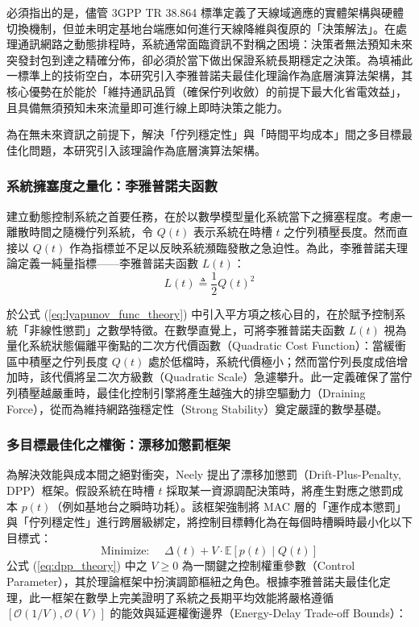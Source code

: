 必須指出的是，儘管 3GPP TR 38.864 標準定義了天線域適應的實體架構與硬體切換機制，但並未明定基地台端應如何進行天線降維與復原的「決策解法」。在處理通訊網路之動態排程時，系統通常面臨資訊不對稱之困境：決策者無法預知未來突發封包到達之精確分佈，卻必須於當下做出保證系統長期穩定之決策。為填補此一標準上的技術空白，本研究引入李雅普諾夫最佳化理論作為底層演算法架構，其核心優勢在於能於「維持通訊品質（確保佇列收斂）的前提下最大化省電效益」，且具備無須預知未來流量即可進行線上即時決策之能力。

為在無未來資訊之前提下，解決「佇列穩定性」與「時間平均成本」間之多目標最佳化問題，本研究引入該理論作為底層演算法架構。

\subsubsection{系統擁塞度之量化：李雅普諾夫函數}
建立動態控制系統之首要任務，在於以數學模型量化系統當下之擁塞程度。考慮一離散時間之隨機佇列系統，令 $Q(t)$ 表示系統在時槽 $t$ 之佇列積壓長度。然而直接以 $Q(t)$ 作為指標並不足以反映系統瀕臨發散之急迫性。為此，李雅普諾夫理論定義一純量指標——李雅普諾夫函數 $L(t)$：
\begin{equation}
    L(t) \triangleq \frac{1}{2} Q(t)^2
    \label{eq:lyapunov_func_theory}
\end{equation}

於公式 (\ref{eq:lyapunov_func_theory}) 中引入平方項之核心目的，在於賦予控制系統「非線性懲罰」之數學特徵。在數學直覺上，可將李雅普諾夫函數 $L(t)$ 視為量化系統狀態偏離平衡點的二次方代價函數（Quadratic Cost Function）：當緩衝區中積壓之佇列長度 $Q(t)$ 處於低檔時，系統代價極小；然而當佇列長度成倍增加時，該代價將呈二次方級數（Quadratic Scale）急遽攀升。此一定義確保了當佇列積壓越嚴重時，最佳化控制引擎將產生越強大的排空驅動力（Draining Force），從而為維持網路強穩定性（Strong Stability）奠定嚴謹的數學基礎。
\subsubsection{多目標最佳化之權衡：漂移加懲罰框架}
為解決效能與成本間之絕對衝突，Neely 提出了漂移加懲罰（Drift-Plus-Penalty, DPP）框架。假設系統在時槽 $t$ 採取某一資源調配決策時，將產生對應之懲罰成本 $p(t)$（例如基地台之瞬時功耗）。該框架強制將 MAC 層的「運作成本懲罰」與「佇列穩定性」進行跨層級綁定，將控制目標轉化為在每個時槽瞬時最小化以下目標式：
\begin{equation}
    \text{Minimize: } \quad \Delta(t) + V \cdot \mathbb{E} [p(t) \mid Q(t)] 
    \label{eq:dpp_theory}
\end{equation}
公式 (\ref{eq:dpp_theory}) 中之 $V \ge 0$ 為一關鍵之控制權重參數（Control Parameter），其於理論框架中扮演調節樞紐之角色。根據李雅普諾夫最佳化定理，此一框架在數學上完美證明了系統之長期平均效能將嚴格遵循 $[ \mathcal{O}(1/V), \mathcal{O}(V) ]$ 的能效與延遲權衡邊界（Energy-Delay Trade-off Bounds）：

